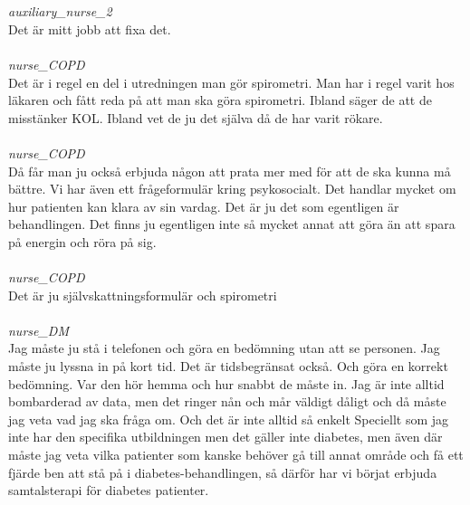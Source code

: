 \documentclass[12pt,a4paper,oneside]{article}
\begin{document}
\ \\\ \\
 { \it   auxiliary\_nurse\_2 %
}\\
Det {\"a}r mitt jobb att fixa det. %
\ \\\ \\
 { \it   nurse\_COPD %
}\\
Det {\"a}r i regel en del i utredningen man g{\"o}r spirometri. Man har i regel varit hos l{\"a}karen och f{\aa}tt reda p{\aa} att man ska g{\"o}ra spirometri. Ibland s{\"a}ger de att de misst{\"a}nker KOL. Ibland vet de ju det sj{\"a}lva d{\aa} de har varit r{\"o}kare. %
\ \\\ \\
 { \it   nurse\_COPD %
}\\
D{\aa} f{\aa}r man ju ocks{\aa} erbjuda n{\aa}gon att prata mer med f{\"o}r att de ska kunna m{\aa} b{\"a}ttre. Vi har {\"a}ven ett fr{\aa}geformul{\"a}r kring psykosocialt. Det handlar mycket om hur patienten kan klara av sin vardag. Det {\"a}r ju det som egentligen {\"a}r behandlingen. Det finns ju egentligen inte s{\aa} mycket annat att g{\"o}ra {\"a}n att spara p{\aa} energin och r{\"o}ra p{\aa} sig. %
\ \\\ \\
 { \it   nurse\_COPD %
}\\
Det {\"a}r ju sj{\"a}lvskattningsformul{\"a}r och spirometri %
\ \\\ \\
 { \it   nurse\_DM %
}\\
Jag m{\aa}ste ju st{\aa} i telefonen och g{\"o}ra en bed{\"o}mning utan att se personen. Jag m{\aa}ste ju lyssna in p{\aa} kort tid. Det {\"a}r tidsbegr{\"a}nsat ocks{\aa}. Och g{\"o}ra en korrekt bed{\"o}mning. Var den h{\"o}r hemma och hur snabbt de m{\aa}ste in. Jag {\"a}r inte alltid bombarderad av data, men det ringer n{\aa}n och m{\aa}r v{\"a}ldigt d{\aa}ligt och d{\aa} m{\aa}ste jag veta vad jag ska fr{\aa}ga om. Och det {\"a}r inte alltid s{\aa} enkelt Speciellt som jag inte har den specifika utbildningen men det g{\"a}ller inte diabetes, men {\"a}ven d{\"a}r m{\aa}ste jag veta vilka patienter som kanske beh{\"o}ver g{\aa} till annat omr{\aa}de och f{\aa} ett fj{\"a}rde ben att st{\aa} p{\aa} i diabetes-behandlingen, s{\aa} d{\"a}rf{\"o}r har vi b{\"o}rjat erbjuda samtalsterapi f{\"o}r diabetes patienter. %
\end{document}
